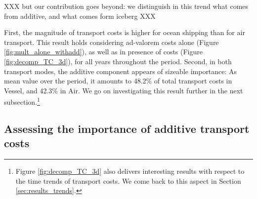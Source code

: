 \documentclass[a4paper,11pt]{article}
\begin{document}
XXX but our contribution goes beyond: we distinguish in this trend what comes from additive, and what comes form iceberg XXX

First, the magnitude of transport costs is higher for ocean shipping than for air transport. This result holds considering ad-valorem costs alone (Figure \ref{fig:mult_alone_withadd}), as well as in presence of costs (Figure \ref{fig:decomp_TC_3d}), for all years throughout the period. Second, in both transport modes, the additive component appears of sizeable importance: As mean value over the period, it amounts to 48.2\% of total transport costs in Vessel, and 42.3\% in Air. We go on investigating this result further in the next subsection.\footnote{Figure \ref{fig:decomp_TC_3d} also delivers interesting results with respect to the time trends of transport costs. We come back to this aspect in Section \ref{sec:results_trends}.}





\subsection{Assessing the importance of additive transport costs}
\end{document}
